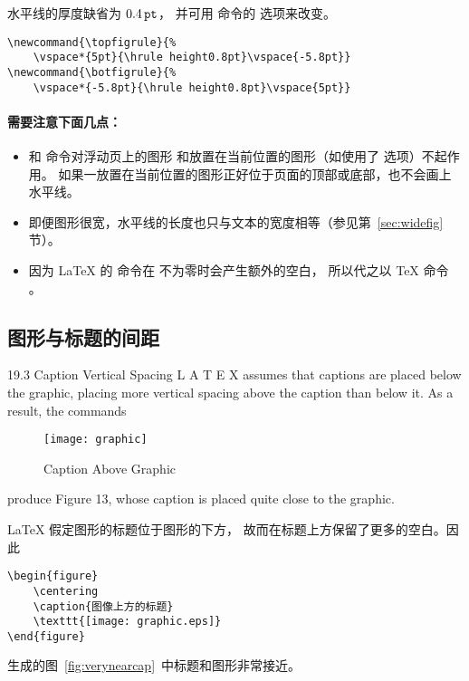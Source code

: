 水平线的厚度缺省为 $0.4\,\mathtt{pt}$，
并可用  命令的  选项来改变。
\begin{lstlisting}
\newcommand{\topfigrule}{% 
	\vspace*{5pt}{\hrule height0.8pt}\vspace{-5.8pt}} 
\newcommand{\botfigrule}{% 
	\vspace*{-5.8pt}{\hrule height0.8pt}\vspace{5pt}}
\end{lstlisting}

\paragraph{需要注意下面几点：}
\begin{itemize}
	\item {} 和  命令对浮动页上的图形
	和放置在当前位置的图形（如使用了 选项）不起作用。
	如果一放置在当前位置的图形正好位于页面的顶部或底部，也不会画上水平线。
	\item 即便图形很宽，水平线的长度也只与文本的宽度相等（参见第~\ref{sec:widefig} 节）。
	\item 因为 \LaTeX{} 的 命令在  不为零时会产生额外的空白，
	所以代之以 \TeX{} 命令 。
\end{itemize}


\subsection{图形与标题的间距}\label{ssec:capspace}

19.3 Caption Vertical Spacing
L
A T E X assumes that captions are placed below the graphic, placing more vertical
spacing above the caption than below it. As a result, the commands
\begin{figure}
	\centering
	\caption{Caption Above Graphic}
	\texttt{[image: graphic]}
\end{figure}
produce Figure 13, whose caption is placed quite close to the graphic.

\LaTeX{} 假定图形的标题位于图形的下方，
故而在标题上方保留了更多的空白。因此
\begin{lstlisting}
\begin{figure} 
	\centering 
	\caption{图像上方的标题} 
	\texttt{[image: graphic.eps]} 
\end{figure}
\end{lstlisting}
生成的图~\ref{fig:verynearcap}~中标题和图形非常接近。

